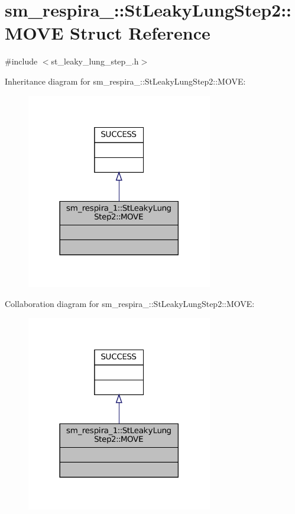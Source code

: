 \hypertarget{structsm__respira__1_1_1StLeakyLungStep2_1_1MOVE}{}\section{sm\+\_\+respira\+\_\+:\+:St\+Leaky\+Lung\+Step2\+:\+:M\+O\+VE Struct Reference}
\label{structsm__respira__1_1_1StLeakyLungStep2_1_1MOVE}


{\ttfamily \#include $<$st\+\_\+leaky\+\_\+lung\+\_\+step\+\_.\+h$>$}



Inheritance diagram for sm\+\_\+respira\+\_\+:\+:St\+Leaky\+Lung\+Step2\+:\+:M\+O\+VE\+:
\nopagebreak
\begin{figure}[H]
\begin{center}
\leavevmode
\includegraphics[width=230pt]{structsm__respira__1_1_1StLeakyLungStep2_1_1MOVE__inherit__graph}
\end{center}
\end{figure}


Collaboration diagram for sm\+\_\+respira\+\_\+:\+:St\+Leaky\+Lung\+Step2\+:\+:M\+O\+VE\+:
\nopagebreak
\begin{figure}[H]
\begin{center}
\leavevmode
\includegraphics[width=230pt]{structsm__respira__1_1_1StLeakyLungStep2_1_1MOVE__coll__graph}
\end{center}
\end{figure}



